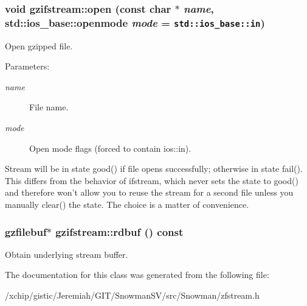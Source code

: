 \subsubsection{\setlength{\rightskip}{0pt plus 5cm}void gzifstream::open (const char $\ast$ {\em name}, std::ios\_\-base::openmode {\em mode} = {\tt std::ios\_\-base::in})}\label{classgzifstream_ee271a71b08dad195bb571f3ce984beb}


Open gzipped file. 

\begin{Desc}
\item[Parameters:]
\begin{description}
\item[{\em name}]File name. \item[{\em mode}]Open mode flags (forced to contain ios::in).\end{description}
\end{Desc}
Stream will be in state good() if file opens successfully; otherwise in state fail(). This differs from the behavior of ifstream, which never sets the state to good() and therefore won't allow you to reuse the stream for a second file unless you manually clear() the state. The choice is a matter of convenience. 
\subsubsection{\setlength{\rightskip}{0pt plus 5cm}\bf{gzfilebuf}$\ast$ gzifstream::rdbuf () const\hspace{0.3cm}{\tt  [inline]}}\label{classgzifstream_a6de717ac7f8c1208ff3b87709743ef0}


Obtain underlying stream buffer. 

The documentation for this class was generated from the following file:\begin{CompactItemize}
\item 
/xchip/gistic/Jeremiah/GIT/Snowman\-SV/src/Snowman/zfstream.h\end{CompactItemize}
